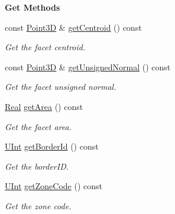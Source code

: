 \begin{Indent}{\bf Get Methods}
\begin{DoxyCompactItemize}
const \hyperlink{classFVCode3D_1_1Point3D}{Point3D} \& \hyperlink{classFVCode3D_1_1Mesh3D_1_1Facet3D_a71c26001376d591ad2612b288f13ebde}{get\+Centroid} () const 
\begin{DoxyCompactList}\small\item\em Get the facet centroid. \end{DoxyCompactList}\item 
const \hyperlink{classFVCode3D_1_1Point3D}{Point3D} \& \hyperlink{classFVCode3D_1_1Mesh3D_1_1Facet3D_acd7cac3cfc7754ca6217f7813f12be49}{get\+Unsigned\+Normal} () const 
\begin{DoxyCompactList}\small\item\em Get the facet unsigned normal. \end{DoxyCompactList}\item 
\hyperlink{namespaceFVCode3D_a40c1f5588a248569d80aa5f867080e83}{Real} \hyperlink{classFVCode3D_1_1Mesh3D_1_1Facet3D_a5911a7cad6e25a6a20e6f1615ed13733}{get\+Area} () const 
\begin{DoxyCompactList}\small\item\em Get the facet area. \end{DoxyCompactList}\item 
\hyperlink{namespaceFVCode3D_a4bf7e328c75d0fd504050d040ebe9eda}{U\+Int} \hyperlink{classFVCode3D_1_1Mesh3D_1_1Facet3D_a341bd5d2f05a9ec1aece9ce5da9ef095}{get\+Border\+Id} () const 
\begin{DoxyCompactList}\small\item\em Get the border\+ID. \end{DoxyCompactList}\item 
\hyperlink{namespaceFVCode3D_a4bf7e328c75d0fd504050d040ebe9eda}{U\+Int} \hyperlink{classFVCode3D_1_1Mesh3D_1_1Facet3D_a6d6da4899793cff2013f95422c6b85fa}{get\+Zone\+Code} () const 
\begin{DoxyCompactList}\small\item\em Get the zone code. \end{DoxyCompactList}\end{DoxyCompactItemize}
\end{Indent}
